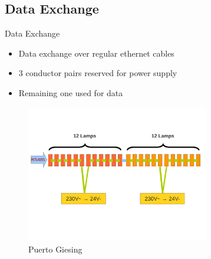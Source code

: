 \documentclass{beamer}
\begin{document}
\subsection{Data Exchange}
  \begin{frame}{Data Exchange}
    \begin{itemize}
      \item Data exchange over regular ethernet cables
      \item 3 conductor pairs reserved for power supply
      \item Remaining one used for data
    \end{itemize}
      \begin{figure}
        \includegraphics[width=8cm, clip, trim= 0cm 4.6cm 0.5cm 4cm]{bilder/12lampen_rs485.pdf}
        \caption{Puerto Giesing}
      \end{figure}
  \end{frame}
\end{document}
